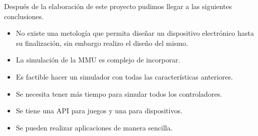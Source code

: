 Después de la elaboración de este proyecto pudimos llegar a las siguientes conclusiones.

\begin{itemize}
\item No existe una metología que permita diseñar un dispositivo electrónico hasta su finalización, sin embargo realizo el diseño del mismo.
\item La simulación de la MMU es complejo de incorporar.
\item Es factible hacer un simulador con todas las características anteriores.
\item Se necesita tener más tiempo para simular todos los controladores.
\item Se tiene una API para juegos y una para dispositivos.
\item Se pueden realizar aplicaciones de manera sencilla.
\end{itemize}


